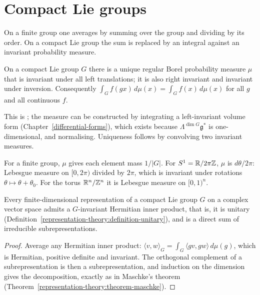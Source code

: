 \section{Compact Lie groups}\label{lie-groups:section-compact}

On a finite group one averages by summing over the group and dividing by its order. On a compact Lie group the sum is replaced by an integral against an
invariant probability measure.

\begin{theorem}\label{lie-groups:theorem-haar}
On a compact Lie group $G$ there is a unique regular Borel probability measure $\mu$ that is invariant under all left translations; it is also right invariant and invariant under inversion. Consequently
$\int_Gf(gx)\,d\mu(x) = \int_Gf(x)\,d\mu(x)$ for all $g$ and all continuous $f$.
\end{theorem}

This is \cite[Chapter I]{brocker-tomdieck}; the measure can be constructed by integrating a left-invariant volume form (Chapter~\ref{differential-forms}), which exists because
$\Lambda^{\dim G}\mathfrak{g}^*$ is one-dimensional, and normalising. Uniqueness follows by convolving two invariant measures.

\begin{example}\label{lie-groups:example-haar}
For a finite group, $\mu$ gives each element mass $1/|G|$. For $S^1 = \mathbb{R}/2\pi\mathbb{Z}$, $\mu$ is $d\theta/2\pi$: Lebesgue measure on $[0, 2\pi)$ divided by $2\pi$,
which is invariant under rotations $\theta \mapsto \theta + \theta_0$. For the torus $\mathbb{R}^n/\mathbb{Z}^n$ it is Lebesgue measure on $[0, 1)^n$.
\end{example}

\begin{corollary}\label{lie-groups:corollary-averaging}
Every finite-dimensional representation of a compact Lie group $G$ on a complex vector space admits a $G$-invariant Hermitian inner product, that is, it is unitary (Definition~\ref{representation-theory:definition-unitary}), and is a direct sum of irreducible subrepresentations.
\end{corollary}

\begin{proof}
Average any Hermitian inner product: $\langle v, w \rangle_G = \int_G\langle gv, gw \rangle\,d\mu(g)$, which is Hermitian, positive definite and invariant. The orthogonal complement of a subrepresentation is
then a subrepresentation, and induction on the dimension gives the decomposition, exactly as in Maschke's theorem (Theorem~\ref{representation-theory:theorem-maschke}).
\end{proof}

